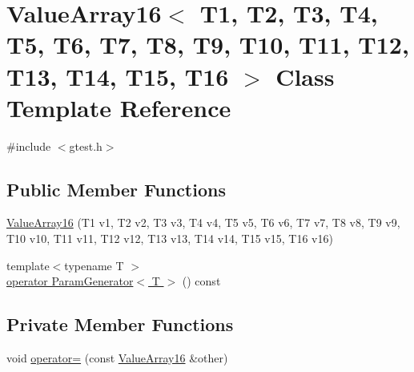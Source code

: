 \hypertarget{classtesting_1_1internal_1_1ValueArray16}{\section{\-Value\-Array16$<$ \-T1, \-T2, \-T3, \-T4, \-T5, \-T6, \-T7, \-T8, \-T9, \-T10, \-T11, \-T12, \-T13, \-T14, \-T15, \-T16 $>$ \-Class \-Template \-Reference}
\label{d7/d7a/classtesting_1_1internal_1_1ValueArray16}
}


{\ttfamily \#include $<$gtest.\-h$>$}

\subsection*{\-Public \-Member \-Functions}
\begin{DoxyCompactItemize}
\item 
\hyperlink{classtesting_1_1internal_1_1ValueArray16_a6ef8039462901a9c7d42c7153242e15b}{\-Value\-Array16} (\-T1 v1, \-T2 v2, \-T3 v3, \-T4 v4, \-T5 v5, \-T6 v6, \-T7 v7, \-T8 v8, \-T9 v9, \-T10 v10, \-T11 v11, \-T12 v12, \-T13 v13, \-T14 v14, \-T15 v15, \-T16 v16)
\item 
{\footnotesize template$<$typename T $>$ }\\\hyperlink{classtesting_1_1internal_1_1ValueArray16_a08ef46fa12c9dd8ef6fc630baeea89b7}{operator Param\-Generator$<$ T $>$} () const 
\end{DoxyCompactItemize}
\subsection*{\-Private \-Member \-Functions}
\begin{DoxyCompactItemize}
\item 
void \hyperlink{classtesting_1_1internal_1_1ValueArray16_a79879bd40dbdc40328c36936c2bde1c2}{operator=} (const \hyperlink{classtesting_1_1internal_1_1ValueArray16}{\-Value\-Array16} \&other)
\end{DoxyCompactItemize}
